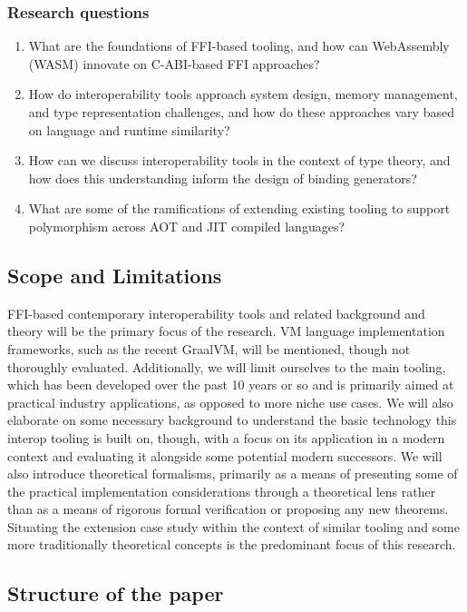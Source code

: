 \subsubsection{Research questions}

\begin{enumerate}
    \item What are the foundations of FFI-based tooling, and how can WebAssembly (WASM) innovate on C-ABI-based FFI approaches? 
    \item How do interoperability tools approach system design, memory management, and type representation challenges, and how do these approaches vary based on language and runtime similarity?
    \item How can we discuss interoperability tools in the context of type theory, and how does this understanding inform the design of binding generators?
    \item What are some of the ramifications of extending existing tooling to support polymorphism across AOT and JIT compiled languages?
\end{enumerate}

\subsection{Scope and Limitations}

FFI-based contemporary interoperability tools and related background and theory will be the primary focus of the research. VM language implementation frameworks, such as the recent GraalVM, will be mentioned, though not thoroughly evaluated. Additionally, we will limit ourselves to the main tooling, which has been developed over the past 10 years or so and is primarily aimed at practical industry applications, as opposed to more niche use cases. We will also elaborate on some necessary background to understand the basic technology this interop tooling is built on, though, with a focus on its application in a modern context and evaluating it alongside some potential modern successors. We will also introduce theoretical formalisms, primarily as a means of presenting some of the practical implementation considerations through a theoretical lens rather than as a means of rigorous formal verification or proposing any new theorems. Situating the extension case study within the context of similar tooling and some more traditionally theoretical concepts is the predominant focus of this research.

\subsection{Structure of the paper}


